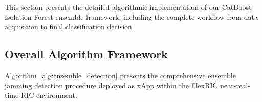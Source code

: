 \documentclass[journal]{IEEEtran}
\begin{document}
This section presents the detailed algorithmic implementation of our CatBoost-Isolation Forest ensemble framework, including the complete workflow from data acquisition to final classification decision.

\subsection{Overall Algorithm Framework}

Algorithm~\ref{alg:ensemble_detection} presents the comprehensive ensemble jamming detection procedure deployed as xApp within the FlexRIC near-real-time RIC environment.

\begin{algorithm}[t]
\caption{CatBoost-Isolation Forest Ensemble Jamming Detection}
\label{alg:ensemble_detection}
\begin{algorithmic}[1]


\end{algorithmic}
\end{algorithm}
\end{document}
